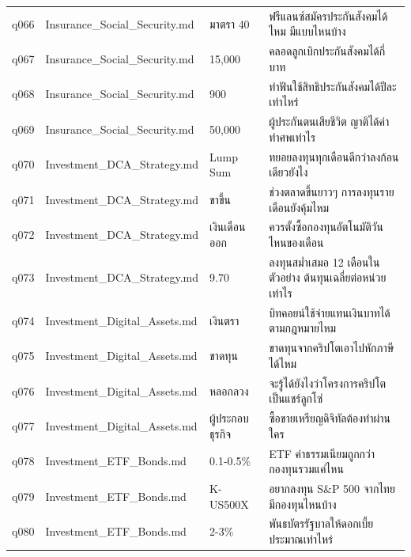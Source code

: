\documentclass[11pt,a4paper]{article}
\begin{document}
{\begin{longtable}{lp{3.6cm}p{3.4cm}p{6.3cm}}
q066 & Insurance\_\allowbreak{}Social\_\allowbreak{}Security.md & {\thaifont มาตรา }40 & {\thaifont ฟรีแลนซ์สมัครประกันสังคมได้ไหม มีแบบไหนบ้าง} \\
q067 & Insurance\_\allowbreak{}Social\_\allowbreak{}Security.md & 15,000 & {\thaifont คลอดลูกเบิกประกันสังคมได้กี่บาท} \\
q068 & Insurance\_\allowbreak{}Social\_\allowbreak{}Security.md & 900 & {\thaifont ทำฟันใช้สิทธิประกันสังคมได้ปีละเท่าไหร่} \\
q069 & Insurance\_\allowbreak{}Social\_\allowbreak{}Security.md & 50,000 & {\thaifont ผู้ประกันตนเสียชีวิต ญาติได้ค่าทำศพเท่าไร} \\
q070 & Investment\_\allowbreak{}DCA\_\allowbreak{}Strategy.md & Lump Sum & {\thaifont ทยอยลงทุนทุกเดือนดีกว่าลงก้อนเดียวยังไง} \\
q071 & Investment\_\allowbreak{}DCA\_\allowbreak{}Strategy.md & {\thaifont ขาขึ้น} & {\thaifont ช่วงตลาดขึ้นยาวๆ การลงทุนรายเดือนยังคุ้มไหม} \\
q072 & Investment\_\allowbreak{}DCA\_\allowbreak{}Strategy.md & {\thaifont เงินเดือนออก} & {\thaifont ควรตั้งซื้อกองทุนอัตโนมัติวันไหนของเดือน} \\
q073 & Investment\_\allowbreak{}DCA\_\allowbreak{}Strategy.md & 9.70 & {\thaifont ลงทุนสม่ำเสมอ }12 {\thaifont เดือนในตัวอย่าง ต้นทุนเฉลี่ยต่อหน่วยเท่าไร} \\
q074 & Investment\_\allowbreak{}Digital\_\allowbreak{}Assets.md & {\thaifont เงินตรา} & {\thaifont บิทคอยน์ใช้จ่ายแทนเงินบาทได้ตามกฎหมายไหม} \\
q075 & Investment\_\allowbreak{}Digital\_\allowbreak{}Assets.md & {\thaifont ขาดทุน} & {\thaifont ขาดทุนจากคริปโตเอาไปหักภาษีได้ไหม} \\
q076 & Investment\_\allowbreak{}Digital\_\allowbreak{}Assets.md & {\thaifont หลอกลวง} & {\thaifont จะรู้ได้ยังไงว่าโครงการคริปโตเป็นแชร์ลูกโซ่} \\
q077 & Investment\_\allowbreak{}Digital\_\allowbreak{}Assets.md & {\thaifont ผู้ประกอบธุรกิจ} & {\thaifont ซื้อขายเหรียญดิจิทัลต้องทำผ่านใคร} \\
q078 & Investment\_\allowbreak{}ETF\_\allowbreak{}Bonds.md & 0.1-0.5\% & ETF {\thaifont ค่าธรรมเนียมถูกกว่ากองทุนรวมแค่ไหน} \\
q079 & Investment\_\allowbreak{}ETF\_\allowbreak{}Bonds.md & K-US500X & {\thaifont อยากลงทุน }S\&P 500 {\thaifont จากไทยมีกองทุนไหนบ้าง} \\
q080 & Investment\_\allowbreak{}ETF\_\allowbreak{}Bonds.md & 2-3\% & {\thaifont พันธบัตรรัฐบาลให้ดอกเบี้ยประมาณเท่าไหร่} \\

\end{longtable}}
\end{document}
